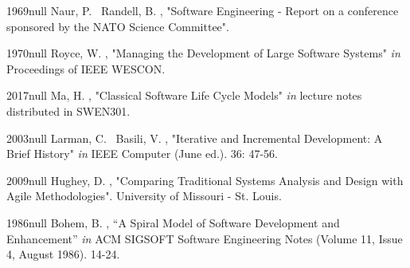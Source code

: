 \documentclass{CRPITStyle}
\begin{document}
\begin{thebibliography}{xx}

  	{1969}{null}
	Naur, P. \harvardand\ Randell, B.  \harvardyearright , "Software Engineering - Report on a conference sponsored by the NATO Science Committee".
	
	\harvarditem{[Royce]}
	{1970}{null}
	Royce, W. \harvardyearright, "Managing the Development of Large Software Systems" {\em in} Proceedings of IEEE WESCON.

	\harvarditem{[Ma]}
	{2017}{null}
	Ma, H. \harvardyearright, "Classical Software Life Cycle Models" {\em in} lecture notes distributed in SWEN301.
	
	\harvarditem{[Larman]}
	{2003}{null}
	Larman, C. \harvardand\ Basili, V. \harvardyearright, "Iterative and Incremental Development: A Brief History" {\em in} IEEE Computer (June ed.). 36:
	47-56.
	
	\harvarditem{[Hughey]}
	{2009}{null}
	Hughey, D. \harvardyearright, "Comparing Traditional Systems Analysis and Design with Agile Methodologies". University of
	Missouri - St. Louis.
	
	\harvarditem{[Boehm]}
	{1986}{null}
	Bohem, B. \harvardyearright, ``A Spiral Model of Software Development and Enhancement'' {\em in} ACM SIGSOFT Software Engineering
	Notes (Volume 11, Issue 4, August 1986). 14-24.

\end{thebibliography}
		
\end{document}

